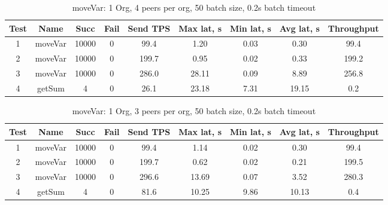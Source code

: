 \begin{appendices}
\begin{table}[h!]
\begin{center}
\begin{tabular}{ |c|c|c|c|c|c|c|c|c| }
 \hline
  Test & Name & Succ  & Fail & Send TPS & Max lat, s & Min lat, s & Avg lat, s & Throughput \\
 \hline
 \hline
 1    & moveVar & 10000 & 0    & 99.4  & 1.20      & 0.03      & 0.30      & 99.4 \\
 \hline
 2    & moveVar & 10000 & 0    & 199.7 & 0.95      & 0.02      & 0.33      & 199.2 \\
 \hline
 3    & moveVar & 10000 & 0    & 286.0 & 28.11     & 0.09      & 8.89      & 256.8 \\
 \hline
 4    & getSum  & 4     & 0    & 26.1  & 23.18     & 7.31      & 19.15     & 0.2 \\
 \hline
\end{tabular}
\end{center}
\caption{moveVar: 1 Org, 4 peers per org, 50 batch size, 0.2s batch timeout}
\end{table}

\begin{table}[h!]
\begin{center}
\begin{tabular}{ |c|c|c|c|c|c|c|c|c| }
 \hline
  Test & Name & Succ  & Fail & Send TPS & Max lat, s & Min lat, s & Avg lat, s & Throughput \\
 \hline
 \hline
 1    & moveVar & 10000 & 0    & 99.4  & 1.14      & 0.02      & 0.30      & 99.4  \\
 \hline
 2    & moveVar & 10000 & 0    & 199.7 & 0.62      & 0.02      & 0.21      & 199.5 \\
 \hline
 3    & moveVar & 10000 & 0    & 296.6 & 13.69     & 0.07      & 3.52      & 280.3 \\
 \hline
 4    & getSum  & 4     & 0    & 81.6  & 10.25     & 9.86      & 10.13     & 0.4   \\
 \hline
\end{tabular}
\end{center}
\caption{moveVar: 1 Org, 3 peers per org, 50 batch size, 0.2s batch timeout}
\end{table}


\end{appendices}
